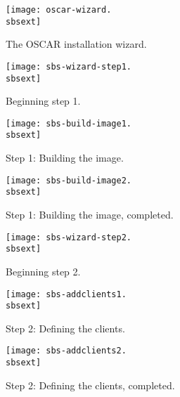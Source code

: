\begin{figure}[htbp]
  \begin{center}
    \texttt{[image: oscar-wizard.\\sbsext]}
    \caption{The OSCAR installation wizard.}
    \label{fig:sbs-install-wizard}
  \end{center}
\end{figure}

\begin{figure}[htbp]
  \begin{center}
    \texttt{[image: sbs-wizard-step1.\\sbsext]}
    \caption{Beginning step 1.}
    \label{fig:sbs-install-wizard-s1}
  \end{center}
\end{figure}

\begin{figure}[htbp]
  \begin{center}
    \texttt{[image: sbs-build-image1.\\sbsext]}
    \caption{Step 1: Building the image.}
    \label{fig:sbs-build-image}
  \end{center}
\end{figure}

\begin{figure}[htbp]
  \begin{center}
    \texttt{[image: sbs-build-image2.\\sbsext]}
    \caption{Step 1: Building the image, completed.}
    \label{fig:sbs-build-image2}
  \end{center}
\end{figure}

\begin{figure}[htbp]
  \begin{center}
    \texttt{[image: sbs-wizard-step2.\\sbsext]}
    \caption{Beginning step 2.}
    \label{fig:sbs-install-wizard-s2}
  \end{center}
\end{figure}

\begin{figure}[htbp]
  \begin{center}
    \texttt{[image: sbs-addclients1.\\sbsext]}
    \caption{Step 2: Defining the clients.}
    \label{fig:sbs-define-clients}
  \end{center}
\end{figure}

\begin{figure}[htbp]
  \begin{center}
    \texttt{[image: sbs-addclients2.\\sbsext]}
    \caption{Step 2: Defining the clients, completed.}
    \label{fig:sbs-define-clients2}
  \end{center}
\end{figure}

